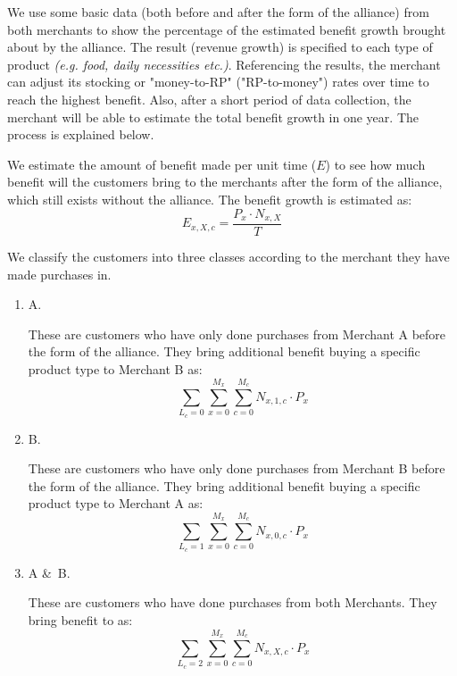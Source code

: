 We use some basic data (both before and after the form of the alliance) from both merchants to show the percentage of the estimated benefit growth brought about by the alliance. The result (revenue growth) is specified to each type of product \textsl{(e.g. food, daily necessities etc.)}. Referencing the results, the merchant can adjust its stocking or "money-to-RP" ("RP-to-money") rates over time to reach the highest benefit. Also, after a short period of data collection, the merchant will be able to estimate the total benefit growth in one year. The process is explained below.
\newline

\begin{enumerate}[label=(\arabic*)]

We estimate the amount of benefit made per unit time ($E$) to see how much benefit will the customers bring to the merchants after the form of the alliance, which still exists without the alliance. The benefit growth is estimated as:
\[  E_{x,X,c} = \frac{P_x \cdot N_{x,X}}{T}  \]


We classify the customers into three classes according to the merchant they have made purchases in.

\begin{enumerate}[label=(\alph*)]
\item A.

These are customers who have only done purchases from Merchant A before the form of the alliance. They bring additional benefit buying a specific product type to Merchant B as:
\[
\sum\limits_{L_c  = 0} {\sum\limits_{x = 0}^{M_x} {\sum\limits_{c = 0}^{M_c } {N_{x,1,c}  \cdot P_x } } } \]

\item B.

These are customers who have only done purchases from Merchant B before the form of the alliance. They bring additional benefit buying a specific product type to Merchant A as:
\[
\sum\limits_{L_c  = 1} {\sum\limits_{x = 0}^{M_x}} {\sum\limits_{c = 0}^{M_c} } {N_{x,0,c}  \cdot P_x }
\]

\item A \&\ B.

These are customers who have done purchases from both Merchants. They bring benefit to  as:
\[
\sum\limits_{L_c  = 2} {\sum\limits_{x = 0}^{M_x} {\sum\limits_{c = 0}^{M_c} {N_{x,X,c}  \cdot P_x } } } \]


\end{enumerate}
\end{enumerate}
